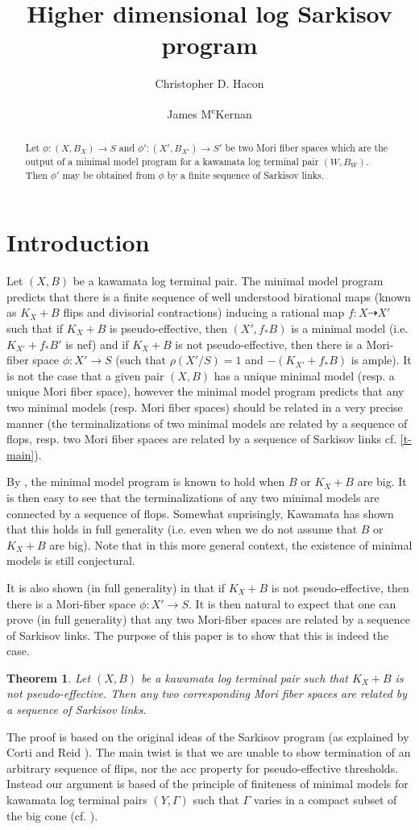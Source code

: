 \documentclass[12pt]{amsart}
\author{Christopher D. Hacon}
\author{James M\textsuperscript{c}Kernan}
\title{Higher dimensional log Sarkisov program}
\theoremstyle{plain}
\newtheorem{theorem}{Theorem}[section]
\begin{document}
\begin{abstract} Let $\phi:(X,B_X)\to S$ and $\phi ':(X',B_{X'})\to S'$ 
be two Mori fiber spaces which are the output of a minimal model program for a kawamata log terminal pair $(W,B_W)$. Then $\phi'$ may be obtained from 
$\phi$ by a finite sequence of Sarkisov links.
\end{abstract}
\maketitle
\section{Introduction}
Let $(X,B)$ be a kawamata log terminal pair. The minimal model program 
predicts that there is a finite sequence of well understood
birational maps (known as $K_X+B$ flips and divisorial
contractions) inducing a rational map $f:X\dasharrow X'$
such that if $K_X+B$ is pseudo-effective, then $(X',f_*B)$ is a minimal model 
(i.e. $K_{X'}+f_*B'$ is nef)
and if $K_X+B$ is not pseudo-effective, then there is a Mori-fiber space
$\phi :X'\to S$ (such that $\rho (X'/S)=1$ and $-(K_{X'}+f_*B)$ is ample).
It is not the case that a given pair $(X,B)$ has a unique 
minimal model (resp. a unique Mori fiber space), however the minimal model 
program predicts that any two minimal models (resp. Mori fiber spaces)
should be related in a very precise manner (the terminalizations of two 
minimal models are related by a sequence of flops, resp.
two Mori fiber spaces are related 
by a sequence of Sarkisov links cf. \eqref{t-main}).
  
By \cite{BCHM}, the minimal model program is known to hold when $B$ or $K_X+B$ are big. It is then easy to see that the terminalizations of any two minimal 
models are connected by a sequence of flops.
Somewhat suprisingly, Kawamata \cite{Kawamata07} has shown that this holds 
in full generality (i.e. even when we do not assume that $B$ or $K_X+B$ are big). Note that
in this more general context, the existence of minimal models is still conjectural.

It is also shown (in full generality) 
in \cite{BCHM} that if $K_X+B$ is not pseudo-effective, 
then there is a Mori-fiber space $\phi :X'\to S$. It is then natural to expect 
that one can prove (in full generality) that any two Mori-fiber spaces
are related 
by a sequence of Sarkisov links.
The purpose of this paper is to show that this is indeed the case.
\begin{theorem} Let $(X,B)$ be a kawamata log terminal pair such that
$K_X+B$ is not pseudo-effective. Then any two corresponding Mori
fiber spaces are related by a sequence of Sarkisov links.
\end{theorem}
The proof is based on the original ideas of the Sarkisov program (as explained by Corti and Reid \cite{Corti95}).
The main twist is that we are unable to show termination of an arbitrary
sequence of flips, nor the acc property for pseudo-effective thresholds.
Instead our argument is based of the principle of
finiteness of minimal models for
kawamata log terminal
pairs $(Y,\Gamma )$ such that $\Gamma$ varies in a compact subset
of the big cone (cf. \cite{BCHM}).
  
\end{document}
